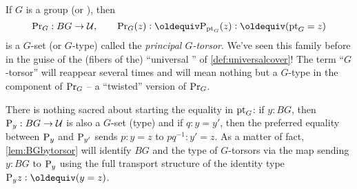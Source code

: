 \begin{example}\label{def:principaltorsor}
  If $G$ is a group (or \inftygp), then
$$\princ G:BG\to\UU,\qquad\princ G(z)\defequi\pathsp{\pt_G}(z)\defequi(\pt_G=z)$$ is a $G$-set (or $G$-type) called the \emph{principal $G$-torsor}.  
We've seen this family before in the guise of the (fibers of the) ``universal \covering'' of \cref{def:universalcover}!  
The term ``$G$-torsor'' will reappear several times and will mean nothing but a $G$-type in the component of $\mathrm{Pr}_{{G}}$ -- a ``twisted'' version of $\mathrm{Pr}_{{G}}$.

There is nothing sacred about starting the equality in ${\mathord{\mathrm{pt}}}_G$: if $y:BG$, then $\mathrm{P}_{y}:BG\to\mathcal{U}$ is also a $G$-set (type) and if $q:y=y'$, then the preferred equality between $\mathrm{P}_{y}$ and $\mathrm{P}_{y'}$ sends $p:y=z$ to $pq^{-1}:y'=z$.  As a matter of fact, \cref{lem:BGbytorsor} will identify $BG$ and the type of $G$-torsors via the map sending $y:BG$ to $\mathrm{P}_{y}$ using the full transport structure of the identity type $\pathsp yz\defequi(y=z)$.
 
\end{example}

